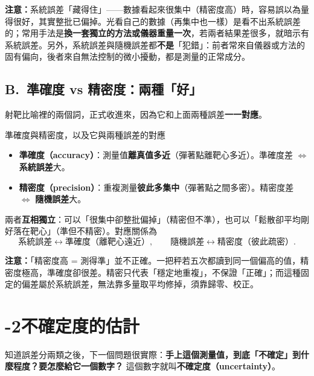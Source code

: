 \documentclass[11pt]{article}
\begin{document}
\textbf{注意：}系統誤差「藏得住」——數據看起來很集中（精密度高）時，容易誤以為量得很好，其實整批已偏掉。光看自己的數據（再集中也一樣）是看不出系統誤差的；常用手法是\textbf{換一套獨立的方法或儀器重量一次}，若兩者結果差很多，就暗示有系統誤差。另外，系統誤差與隨機誤差都\textbf{不是}「犯錯」：前者常來自儀器或方法的固有偏向，後者來自無法控制的微小擾動，都是測量的正常成分。

\subsection*{\sffamily B.\ 準確度 vs 精密度：兩種「好」}

射靶比喻裡的兩個詞，正式收進來，因為它和上面兩種誤差\textbf{一一對應}。

\begin{補充框}{準確度與精密度，以及它與兩種誤差的對應}
\begin{itemize}\setlength{\itemsep}{2pt}
\item \textbf{準確度（accuracy）}：測量值\textbf{離真值多近}（彈著點離靶心多近）。準確度差 $\Longleftrightarrow$ \textbf{系統誤差}大。
\item \textbf{精密度（precision）}：重複測量\textbf{彼此多集中}（彈著點之間多密）。精密度差 $\Longleftrightarrow$ \textbf{隨機誤差}大。
\end{itemize}
兩者\textbf{互相獨立}：可以「很集中卻整批偏掉」（精密但不準），也可以「鬆散卻平均剛好落在靶心」（準但不精密）。對應關係為
$$\text{系統誤差} \longleftrightarrow \text{準確度（離靶心遠近）}, \qquad \text{隨機誤差} \longleftrightarrow \text{精密度（彼此疏密）}.$$
\end{補充框}


\textbf{注意：}「精密度高 = 測得準」並不正確。一把秤若五次都讀到同一個偏高的值，精密度極高，準確度卻很差。精密只代表「穩定地重複」，不保證「正確」；而這種固定的偏差屬於系統誤差，無法靠多量取平均修掉，須靠歸零、校正。

\section*{-2\quad 不確定度的估計}

知道誤差分兩類之後，下一個問題很實際：\textbf{手上這個測量值，到底「不確定」到什麼程度？要怎麼給它一個數字？} 這個數字就叫\textbf{不確定度（uncertainty）}。
\end{document}
